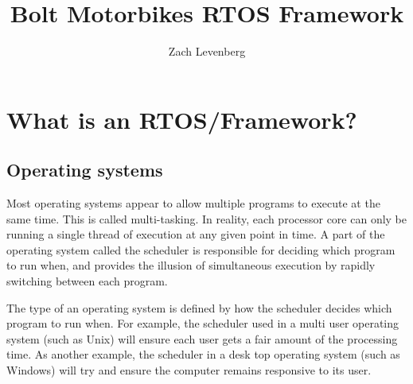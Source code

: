 \documentclass[12pt compsoc]{article}
\begin{document}
\title{Bolt Motorbikes RTOS Framework}

\author{Zach Levenberg}

\maketitle


\begin{figure}[H]
\centering
\end{figure}

\begin{figure}[b!]
\centering
\end{figure}

\newpage



\newpage

\tableofcontents
\newpage


\section{What is an RTOS/Framework?}

\subsection{Operating systems}
Most operating systems appear to allow multiple programs to execute at the same time. This is called multi-tasking. In reality, each processor core can only be running a single thread of execution at any given point in time. A part of the operating system called the scheduler is responsible for deciding which program to run when, and provides the illusion of simultaneous execution by rapidly switching between each program.

The type of an operating system is defined by how the scheduler decides which program to run when. For example, the scheduler used in a multi user operating system (such as Unix) will ensure each user gets a fair amount of the processing time. As another example, the scheduler in a desk top operating system (such as Windows) will try and ensure the computer remains responsive to its user.
\end{document}
